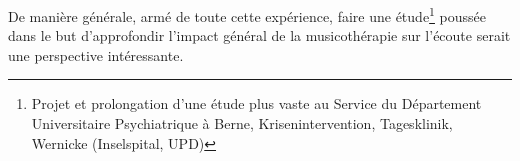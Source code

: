 De manière générale, armé de toute cette expérience, faire une étude\footnote{ Projet et
	prolongation d'une étude plus vaste au Service du
	Département Universitaire Psychiatrique à Berne, Krisenintervention,
	Tagesklinik, Wernicke (Inselspital, UPD) } poussée dans le but d'approfondir l'impact général de la
musicothérapie sur l'écoute serait une perspective intéressante.




















